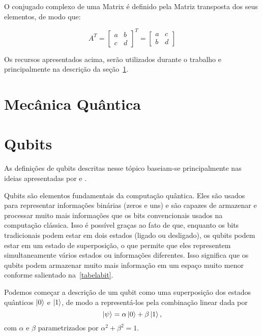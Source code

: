 O conjugado complexo de uma Matrix é definido pela Matriz transposta dos seus elementos, de modo que:

\begin{equation}\label{eq:conjugadomatrix}
A^T = \left[\begin{matrix}
a & b \\
c & d
\end{matrix}\right]^T = \left[\begin{matrix}
a & c \\
b & d
\end{matrix}\right]
\end{equation}

Os recursos apresentados acima, serão utilizados durante o trabalho e principalmente na descrição da seção~\ref{Mecanicaquantica}.

\section{Mecânica Quântica}\label{Mecanicaquantica}



\section{Qubits}

As definições de qubits descritas nesse tópico baseiam-se principalmente nas ideias apresentadas por \textcite{chuang} e \textcite{CompInfoQuantica}.

Qubits são elementos fundamentais da computação quântica. Eles são usados para representar informações binárias (zeros e uns) e são capazes de armazenar e processar muito mais informações que os bits convencionais usados na computação clássica. Isso é possível graças ao fato de que, enquanto os bits tradicionais podem estar em dois estados (ligado ou desligado), os qubits podem estar em um estado de superposição, o que permite que eles representem simultaneamente vários estados ou informações diferentes. Isso significa que os qubits podem armazenar muito mais informação em um espaço muito menor conforme salientado na~\ref{tabelabit}.

Podemos começar a descrição de um qubit como uma superposição dos estados quânticos $\ket{0}$ e $\ket{1}$, de modo a representá-los pela combinação linear dada por
\begin{equation}\label{eq:psi}
\ket{\psi} = \alpha \ket{0} + \beta \ket{1},
\end{equation}
com $\alpha$ e $\beta$ parametrizados por \(\alpha^{2} + \beta^{2} = 1\).

